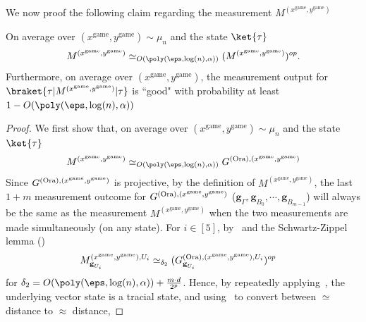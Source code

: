 We now proof the following claim regarding the measurement $M^{(x^{\text{game}}, y^{\text{game}})}$
\begin{claim} \label{claim:ARgoodoutput}
	On average over $(x^{\text{game}}, y^{\text{game}}) \sim \mu_n$ and the state $\ket{\tau}$
	\begin{equation} \label{eq:ARproofSynccondpoly}
		M^{(x^{\text{game}}, y^{\text{game}})} \simeq_{O(\poly(\eps, \log(n), \alpha))}  (M^{(x^{\text{game}}, y^{\text{game}})})^{op}.
	\end{equation}
	Furthermore, on average over $(x^{\text{game}}, y^{\text{game}})$, the measurement output for $\braket{\tau|M^{(x^{\text{game}}, y^{\text{game}})}|\tau}$ is ``good" with probability at least $1 - O(\poly(\eps, \log(n), \alpha))$
\end{claim}
\begin{proof}
	 We first show that, on average over $(x^{\text{game}}, y^{\text{game}}) \sim \mu_n$ and the state $\ket{\tau}$
	\begin{equation} \label{eq:ARsoundnessgoodoutcome-1}
		M^{(x^{\text{game}}, y^{\text{game}})} \simeq_{O(\poly(\eps, \log(n), \alpha))}  G^{(\text{Ora}), (x^{\game}, y^{\game})}
	\end{equation}
	Since $G^{(\text{Ora}), (x^{\text{game}}, y^{\text{game}})}$ is projective, by the definition of $M^{(x^{\text{game}}, y^{\text{game}})}$, the last $1+m$ measurement outcome for $G^{(\text{Ora}), (x^{\text{game}}, y^{\text{game}})}$ ($ \textbf{g}_{\Gamma}, \textbf{g}_{B_0},\cdots,  \textbf{g}_{B_{m-1}}$) will always be the same as the measurement $M^{(x^{\text{game}}, y^{\text{game}})}$ when the two measurements are made simultaneously (on any state). 
	For $i \in [5]$, by~ and the Schwartz-Zippel lemma ()
	\begin{align*}
		M^{(x^{\text{game}}, y^{\text{game}}), U_i}_{\textbf{g}_{U_i}}&\simeq_{\delta_2} (G_{\textbf{g}_{U_i}}^{(\text{Ora}), (x^{\text{game}}, y^{\text{game}}), U_i})^{op}
	\end{align*}
	for $\delta_2 = O(\poly(\eps, \log(n), \alpha)) + \frac{m \cdot d}{2^p}$. Hence, by repeatedly applying~, the underlying vector state is a tracial state, and using~ to convert between $\simeq$ distance to $\approx$ distance,
\end{proof}
